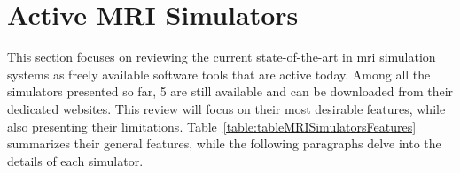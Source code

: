 \section{Active MRI Simulators}
\label{chapterlabel2secMRISIMULATORS}

This section focuses on reviewing the current state-of-the-art in \ac{mri} simulation systems as freely available software tools that are active today.
Among all the simulators presented so far, 5 are still available and can be downloaded from their dedicated websites.
This review will focus on their most desirable features, while also presenting their limitations.
Table~\ref{table:tableMRISimulatorsFeatures} summarizes their general features,
while the following paragraphs delve into the details of each simulator.

\hfill

